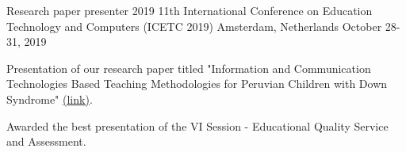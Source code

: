 

\begin{cventries}

  \cventry
    {Research paper presenter} %
    {2019 11th International Conference on Education Technology and Computers (ICETC 2019)} %
    {Amsterdam, Netherlands} %
    {October 28-31, 2019} %
    {
      \begin{cvitems} %
        \item {Presentation of our research paper titled "Information and Communication Technologies Based Teaching Methodologies for Peruvian Children with Down Syndrome" \href{https://dl.acm.org/doi/abs/10.1145/3369255.3369270}{(link)}.}
        \item {Awarded the best presentation of the VI Session - Educational Quality Service and Assessment.}
      \end{cvitems}
    }

\end{cventries}
